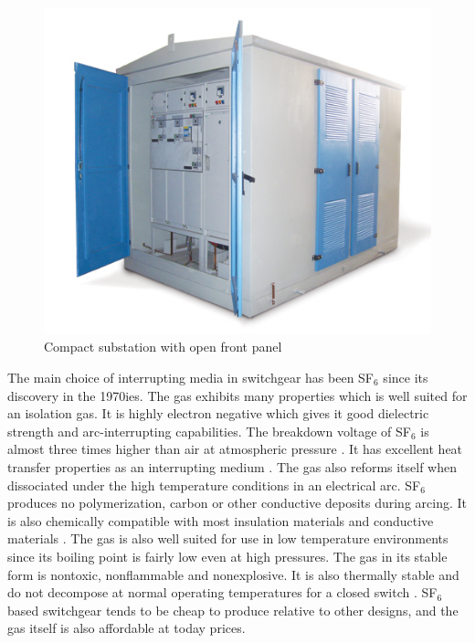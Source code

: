 \documentclass[10pt,a4paper]{article}
\begin{document}
\begin{figure} [h]
\centering
\includegraphics[scale=0.5]{Bilder/Introduction/general_substation.jpg}
\caption{Compact substation with open front panel} \label{fig:compact substation}
\end{figure}

The main choice of interrupting media in switchgear has been SF$_6$ since its discovery in the 1970ies. The gas exhibits many properties which is well suited for an isolation gas. It is highly electron negative which gives it good dielectric strength and arc-interrupting capabilities. The breakdown voltage of SF$_6$ is almost three times higher than air at atmospheric pressure \cite{bib:SF6PI}. It has excellent heat transfer properties as an interrupting medium \cite{bib:SF6PI}. The gas also reforms itself when dissociated under the high temperature conditions in an electrical arc. SF$_6$ produces no polymerization, carbon or other conductive deposits during arcing. It is also chemically compatible with most insulation materials and conductive materials \cite{bib:SF6PI}. The gas is also well suited for use in low temperature environments since its boiling point is fairly low even at high pressures. The gas in its stable form is nontoxic, nonflammable and nonexplosive. It is also thermally stable and do not decompose at normal operating temperatures for a closed switch \cite{bib:SF6PI}. SF$_6$ based switchgear tends to be cheap to produce relative to other designs, and the gas itself is also affordable at today prices.
\end{document}
